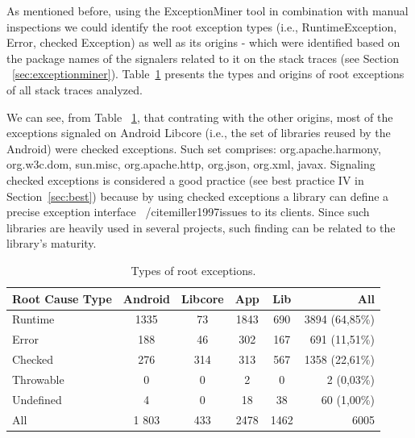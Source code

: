 \documentclass[conference]{IEEEtran}
\begin{document}
As mentioned before, using the ExceptionMiner tool in combination with manual inspections we could identify
the root exception types (i.e., RuntimeException, Error, checked Exception) as well as its origins - which were 
identified based on the package names of the signalers related to it on the stack traces (see Section ~\ref{sec:exceptionminer}).
Table~\ref{tab:typeroottab} presents the types and origins of root exceptions of all stack traces analyzed. 

We can see, from Table ~\ref{tab:typeroottab}, that contrating with the other origins, most of the 
 exceptions signaled on Android Libcore (i.e., the set of libraries reused by the Android) were 
checked exceptions. Such set comprises: org.apache.harmony, org.w3c.dom, sun.misc, 
org.apache.http, org.json, org.xml, javax. Signaling checked exceptions is considered a 
good practice (see best practice IV in Section~\ref{sec:best}) because by using checked exceptions a library can define a precise 
exception interface ~/cite{miller1997issues} to its clients.
 Since such libraries are heavily used  in several projects, such finding can be related to the library's maturity.


\begin{table}
\centering
\begin{tabular}{lccccr}
    \hline
    \bfseries{Root Cause Type} & \bfseries{Android} & \bfseries{Libcore} & \bfseries{App} & \bfseries{Lib}  & \bfseries{All}\\
    \hline

Runtime	&	1335	&	73	&	1843	&	690  &	3894 (64,85\%)\\  %
Error	       &	 188              &	 46	&	302             &	167	           &	691 (11,51\%)	\\
Checked	&	276           &	314	&	313          &	567	           &	1358 (22,61\%)	\\
Throwable	&	0	       &	0	&	2            &	0         &	2 (0,03\%)	\\
Undefined	&	4	&	0	&	18		&	38	   &	60	(1,00\%) \\
 \hline
All		& 1  803	&	433	&	2478	&	1462	&	6005	\\
    \hline
  \end{tabular}
\caption{Types of root exceptions.}
  \label{tab:typeroottab}
\end{table}
\end{document}
